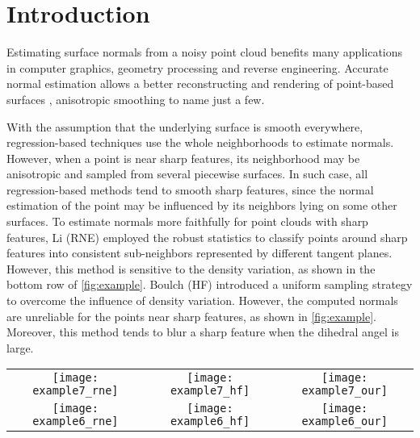\section{Introduction}
Estimating surface normals from a noisy
point cloud benefits many applications in computer graphics, geometry
processing and reverse engineering. Accurate normal estimation allows a better reconstructing and rendering of point-based
surfaces \cite{DBLP:journals/cgf/OtireliGG09,DBLP:conf/siggraph/RusinkiewiczL00,WangGYTZ12,wangjun_cgf13}, anisotropic smoothing \cite{DBLP:journals/cagd/LangeP05} to name just a few.

With the assumption that the underlying surface is smooth everywhere, regression-based techniques \cite{DBLP:conf/siggraph/HoppeDDMS92,GuennebaudG07,CazalsP05,MitraNG04} use the whole neighborhoods to estimate normals. However, when a point is near sharp features, its neighborhood may be anisotropic and sampled from several piecewise surfaces.
In such case, all regression-based methods tend to smooth sharp features, since the normal estimation of the point may be influenced by its neighbors lying on some other surfaces.
%
To estimate normals more faithfully for point clouds with sharp features, Li \etal \cite{DBLP:journals/cg/LiSKCDJ10} (RNE) employed the robust statistics to classify points around sharp features into consistent sub-neighbors represented by different tangent planes.
%
However, this method is sensitive to the density variation, as shown in the bottom row of \fig \ref{fig:example}. Boulch \etal \cite{DBLP:journals/cgf/BoulchM12} (HF) introduced a uniform sampling strategy to overcome the influence of density variation.
%
However, the computed normals are unreliable for the points near sharp features, as shown in \fig \ref{fig:example}.
%
Moreover, this method tends to blur a sharp feature when the dihedral angel is large.
%
\begin{figure*}[htbp]
\begin{center}
    \begin{tabular}{c c c}
        \texttt{[image: example7\_rne]} &
        \texttt{[image: example7\_hf]} &
        \texttt{[image: example7\_our]}\\
        \texttt{[image: example6\_rne]} &
        \texttt{[image: example6\_hf]} &
        \texttt{[image: example6\_our]}
    \end{tabular}
    \caption{\label{fig:example}
    Reconstructed normals of two plans with shallow angle by Li~\etal~\cite{DBLP:journals/cg/LiSKCDJ10} (left), Boulch~\etal~\cite{DBLP:journals/cgf/BoulchM12} (middle) and our algorithm (right). respectively.
    The points are sampled uniformly in the top row and non-uniformly in the bottom row.
    }
\end{center}
\end{figure*}

